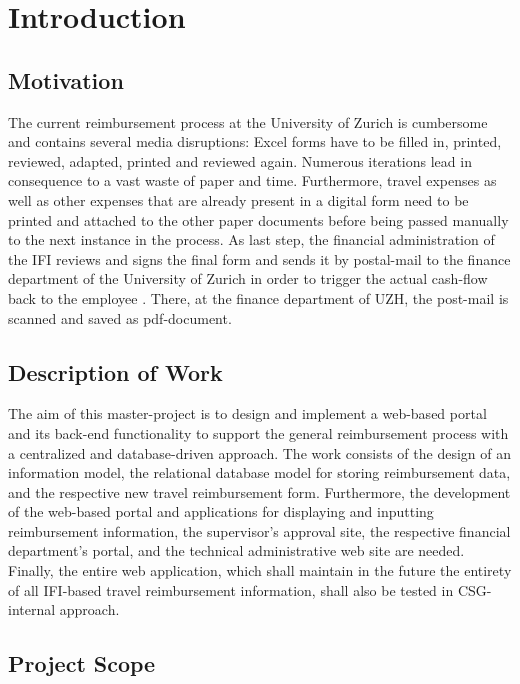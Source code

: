 \chapter{Introduction}

\section{Motivation}

The current reimbursement process at the University of Zurich is cumbersome and contains several media disruptions: Excel forms have to be filled in, printed, reviewed, adapted, printed and reviewed again. Numerous iterations lead in consequence to a vast waste of paper and time. Furthermore, travel expenses as well as other expenses that are already present in a digital form need to be printed and attached to the other paper documents before being passed manually to the next instance in the process. As last step, the financial administration of the IFI reviews and signs the final form and sends it by postal-mail to the finance department of the University of Zurich in order to trigger the actual cash-flow back to the employee \cite{ifi}. There, at the finance department of UZH, the post-mail is scanned and saved as pdf-document.

\section{Description of Work}

The aim of this master-project is to design and implement a web-based portal and its back-end functionality to support the general reimbursement process with a centralized and database-driven approach. The work consists of the design of an information model, the relational database model for storing reimbursement data, and the respective new travel reimbursement form. Furthermore, the development of the web-based portal and applications for displaying and inputting reimbursement information, the supervisor’s approval site, the respective financial department’s portal, and the technical administrative web site are needed. Finally, the entire web application, which shall maintain in the future the entirety of all IFI-based travel reimbursement information, shall also be tested in CSG-internal approach.


\section{Project Scope}

